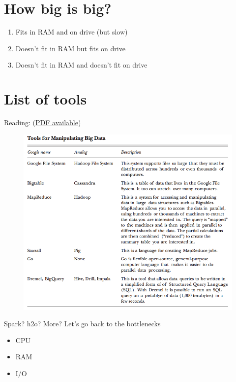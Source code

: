\documentclass[]{book}
\providecommand{\tightlist}{%
  \setlength{\itemsep}{0pt}\setlength{\parskip}{0pt}}
\theoremstyle{definition}
\theoremstyle{definition}
\theoremstyle{definition}
\theoremstyle{remark}
\begin{document}
\section{How big is big?}\label{how-big-is-big}

\begin{enumerate}
\def\labelenumi{\arabic{enumi}.}
\tightlist
\item
  Fits in RAM and on drive (but slow)
\item
  Doesn't fit in RAM but fits on drive
\item
  Doesn't fit in RAM and doesn't fit on drive
\end{enumerate}

\section{List of tools}\label{list-of-tools}

Reading: \citet{Varian2014}
(\href{http://pubs.aeaweb.org/doi/pdfplus/10.1257/jep.28.2.3}{PDF
available})

\begin{figure}

{\centering \includegraphics[width=10.39in]{images/ch6_tool_list} 

}

\end{figure}

Spark? h2o? More? Let's go back to the bottlenecks

\begin{itemize}
\tightlist
\item
  CPU
\item
  RAM
\item
  I/O
\end{itemize}
\end{document}

